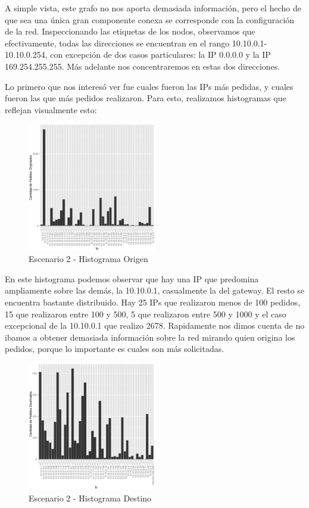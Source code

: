     A simple vista, este grafo no nos aporta demasiada información, pero el hecho de que sea una única gran componente conexa se corresponde con la configuración de la red. Inspeccionando las etiquetas de los nodos, observamos que efectivamente, todas las direcciones se encuentran en el rango 10.10.0.1-10.10.0.254, con excepción de dos casos particulares: la IP 0.0.0.0 y la IP 169.254.255.255. Más adelante nos concentraremos en estas dos direcciones. 
    \par Lo primero que nos interesó ver fue cuales fueron las IPs más pedidas, y cuales fueron las que más pedidos realizaron. Para esto, realizamos histogramas que reflejan visualmente esto:
    \begin{figure}[H]
		\centering
		\includegraphics[width=0.5\textwidth]{img/graph/escenario_2/histogramSrc.eps}
		\caption{Escenario 2 - Histograma Origen}
		\label{fig:escenario2_histogramaSrc}
	\end{figure}       
    En este histograma podemos observar que hay una IP que predomina ampliamente sobre las demás, la 10.10.0.1, casualmente la del gateway. El resto se encuentra bastante distribuido. Hay 25 IPs que realizaron menos de 100 pedidos, 15 que realizaron entre 100 y 500, 5 que realizaron entre 500 y 1000 y el caso excepcional de la 10.10.0.1 que realizo 2678. Rapidamente nos dimos cuenta de no ibamos a obtener demasiada información sobre la red mirando quien origina los pedidos, porque lo importante es cuales son más solicitadas.
       
    \begin{figure}[H]
		\centering
		\includegraphics[width=0.5\textwidth]{img/graph/escenario_2/histogramDst.eps}
		\caption{Escenario 2 - Histograma Destino}
		\label{fig:escenario2_histogramaDst}
	\end{figure}
            

